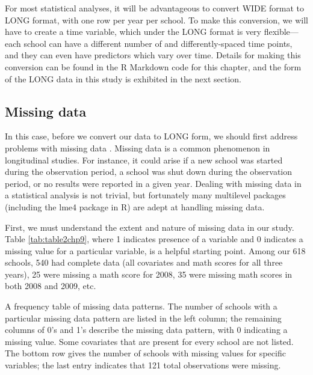 \documentclass[
]{krantz}
\begin{document}
For most statistical analyses, it will be advantageous to convert WIDE format to LONG format, with one row per year per school. To make this conversion, we will have to create a time variable, which under the LONG format is very flexible---each school can have a different number of and differently-spaced time points, and they can even have predictors which vary over time. Details for making this conversion can be found in the R Markdown code for this chapter, and the form of the LONG data in this study is exhibited in the next section.

\hypertarget{missing}{%
\subsection{Missing data}\label{missing}}

In this case, before we convert our data to LONG form, we should first address problems with missing data . Missing data is a common phenomenon in longitudinal studies. For instance, it could arise if a new school was started during the observation period, a school was shut down during the observation period, or no results were reported in a given year. Dealing with missing data in a statistical analysis is not trivial, but fortunately many multilevel packages (including the lme4 package in R) are adept at handling missing data.

First, we must understand the extent and nature of missing data in our study. Table \ref{tab:table2chp9}, where 1 indicates presence of a variable and 0 indicates a missing value for a particular variable, is a helpful starting point. Among our 618 schools, 540 had complete data (all covariates and math scores for all three years), 25 were missing a math score for 2008, 35 were missing math scores in both 2008 and 2009, etc.

\label{tab:table2chp9} A frequency table of missing data patterns. The number of schools with a particular missing data pattern are listed in the left column; the remaining columns of 0's and 1's describe the missing data pattern, with 0 indicating a missing value. Some covariates that are present for every school are not listed. The bottom row gives the number of schools with missing values for specific variables; the last entry indicates that 121 total observations were missing.
\end{document}
